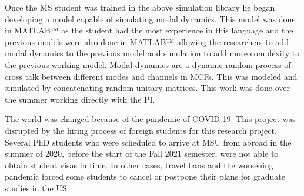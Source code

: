 \documentclass{report}
\begin{document}
Once the MS student was trained in the above simulation library he began developing a model capable of simulating modal dynamics. This model was done in MATLAB™ as the student had the most experience in this language and the previous models were also done in MATLAB™ allowing the researchers to add modal dynamics to the previous model and simulation to add more complexity to the previous working model. Modal dynamics are a dynamic random process of cross talk between different modes and channels in MCFs. This was modeled and simulated by concatenating random unitary matrices. This work was done over the summer working directly with the PI. 

The world was changed because of the pandemic of COVID-19. This project was disrupted by the hiring process of foreign students for this research project. Several PhD students who were scheduled to arrive at MSU from abroad in the summer of 2020, before the start of the Fall 2021 semester, were not able to obtain student visas in time. In other cases, travel bans and the worsening pandemic forced some students to cancel or postpone their plans for graduate studies in the US.   
  

\begin{table}[]
\centering
\caption{Paramters List}
\label{tab:param}
\end{table}
\end{document}
